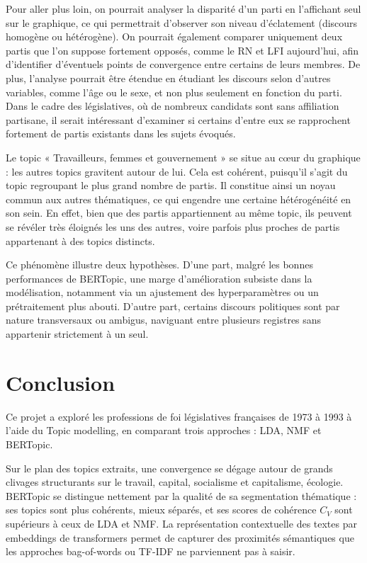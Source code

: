 \documentclass{article}
\begin{document}
Pour aller plus loin, on pourrait analyser la disparité d'un parti en l'affichant seul sur le graphique, ce qui permettrait d'observer son niveau d'éclatement (discours homogène ou hétérogène). On pourrait également comparer uniquement deux partis que l'on suppose fortement opposés, comme le RN et LFI aujourd'hui, afin d'identifier d'éventuels points de convergence entre certains de leurs membres. De plus, l'analyse pourrait être étendue en étudiant les discours selon d'autres variables, comme l'âge ou le sexe, et non plus seulement en fonction du parti. Dans le cadre des législatives, où de nombreux candidats sont sans affiliation partisane, il serait intéressant d'examiner si certains d'entre eux se rapprochent fortement de partis existants dans les sujets évoqués.

Le topic « Travailleurs, femmes et gouvernement » se situe au cœur du graphique : les autres topics gravitent autour de lui. Cela est cohérent, puisqu'il s'agit du topic regroupant le plus grand nombre de partis. Il constitue ainsi un noyau commun aux autres thématiques, ce qui engendre une certaine hétérogénéité en son sein. En effet, bien que des partis appartiennent au même topic, ils peuvent se révéler très éloignés les uns des autres, voire parfois plus proches de partis appartenant à des topics distincts.

Ce phénomène illustre deux hypothèses. D'une part, malgré les bonnes performances de BERTopic, une marge d'amélioration subsiste dans la modélisation, notamment via un ajustement des hyperparamètres ou un prétraitement plus abouti. D'autre part, certains discours politiques sont par nature transversaux ou ambigus, naviguant entre plusieurs registres sans appartenir strictement à un seul.




\section{Conclusion}

Ce projet a exploré les professions de foi législatives françaises de 1973 à 1993 à l'aide du Topic modelling, en comparant trois approches : LDA, NMF et BERTopic.

Sur le plan des topics extraits, une convergence se dégage autour de grands clivages structurants sur le travail, capital, socialisme et capitalisme, écologie. BERTopic se distingue nettement par la qualité de sa segmentation thématique : ses topics sont plus cohérents, mieux séparés, et ses scores de cohérence $C_V$ sont supérieurs à ceux de LDA et NMF. La représentation contextuelle des textes par embeddings de transformers permet de capturer des proximités sémantiques que les approches bag-of-words ou TF-IDF ne parviennent pas à saisir.
\end{document}
